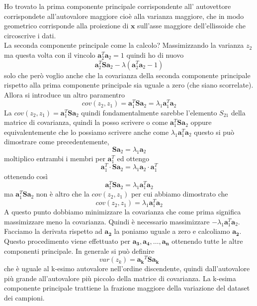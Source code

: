 \noindent Ho trovato la prima componente principale corrispondente all' autovettore corrispondete all'autovalore maggiore cioè alla varianza maggiore, che in modo geometrico corrisponde alla proiezione di $\mathbf{x}$ sull'asse maggiore dell'ellissoide che circoscrive i dati.\\

\noindent La seconda componente principale come la calcolo? Massimizzando la varianza $z_2$ ma questa volta con il vincolo $\mathbf{a}_2^T\mathbf{a}_2 = 1$ quindi ho di nuovo 
\begin{equation}
 \mathbf{a}_2^T \mathbf{S}\mathbf{a}_2 - \lambda(\mathbf{a}_2^T \mathbf{a}_2  -1)
\end{equation}
solo che però voglio anche che la covarianza della seconda componente principale rispetto alla prima componente principale sia uguale a zero (che siano scorrelate). Allora si introduce un altro paramentro 
\begin{equation}
cov(z_2,z_1) = \mathbf{a}_1^T\mathbf{S}\mathbf{a}_2 = \lambda_1\mathbf{a}_1^T\mathbf{a}_2
\end{equation}
La $cov(z_2, z_1) = \mathbf{a}_1^T\mathbf{S}\mathbf{a}_2$ quindi fondamentalmente sarebbe l'elemento $S_{21}$ della matrice di covarianza, quindi la posso scrivere o come $\mathbf{a}_1^T\mathbf{S}\mathbf{a}_2$ oppure equivalentemente che lo possiamo scrivere anche come $\lambda_1\mathbf{a}_1^T\mathbf{a}_2$
questo si può dimostrare come precedentemente, 
\begin{equation}
\mathbf{S}\mathbf{a}_2 = \lambda_1 \mathbf{a}_2
\end{equation}
moltiplico entrambi i membri per $\mathbf{a}_1^T$ ed ottengo
\begin{equation}
\mathbf{a}_1^T \cdot \mathbf{S}\mathbf{a}_2 = \lambda_1 \mathbf{a}_2 \cdot \mathbf{a}_1^T
\end{equation}
ottenendo così
\begin{equation}
\mathbf{a}_1^T \mathbf{S}\mathbf{a}_2 = \lambda_1  \mathbf{a}_1^T \mathbf{a}_2 
\end{equation}
ma $\mathbf{a}_1^T \mathbf{S}\mathbf{a}_2$ non è altro che la $cov(z_2, z_1)$ per cui abbiamo dimostrato che
\begin{equation}
cov(z_2, z_1) = \lambda_1  \mathbf{a}_1^T \mathbf{a}_2 
\end{equation}
A questo punto dobbiamo minimizzare la covarianza che come prima significa massimizzare meno la covarianza. Quindi è necessario massimizzare $- \lambda_1  \mathbf{a}_1^T \mathbf{a}_2$. Facciamo la derivata rispetto ad $\mathbf{a_2}$ la poniamo uguale a zero e calcoliamo $\mathbf{a_2}$. Questo procedimento viene effettuato per $\mathbf{a_3}, \mathbf{a_4}, \dots, \mathbf{a_n}$ ottenendo tutte le altre componenti principale. In generale si può definire 
\begin{equation}
var(z_k) = \mathbf{a_k}^T \mathbf{S} \mathbf{a_k}
\end{equation}
che è uguale al k-esimo autovalore nell'ordine discendente, quindi dall'autovalore più grande all'autovalore più piccolo della matrice di covarianza. La k-esima componente principale trattiene la frazione maggiore della variazione del dataset dei campioni. 


%
